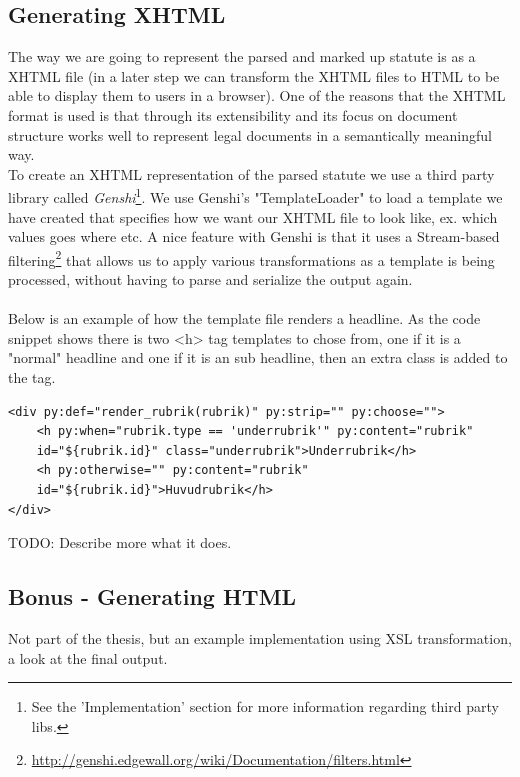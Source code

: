 \subsection{Generating XHTML}
The way we are going to represent the parsed and marked up statute is as a XHTML file (in a later step we can transform the XHTML files to HTML to be able to display them to users in a browser). One of the reasons that the XHTML format is used is that through its extensibility and its focus on document structure works well to represent legal documents in a semantically meaningful way.\\
To create an XHTML representation of the parsed statute we use a third party library called \textit{Genshi}\footnote{See the 'Implementation' section for more information regarding third party libs.}. We use Genshi's "TemplateLoader" to load a template we have created that specifies how we want our XHTML file to look like, ex. which values goes where etc. A nice feature with Genshi is that it uses a Stream-based filtering\footnote{\url{http://genshi.edgewall.org/wiki/Documentation/filters.html}} that allows us to apply various transformations as a template is being processed, without having to parse and serialize the output again.\\\\
Below is an example of how the template file renders a headline. As the code
snippet shows there is two <h> tag templates to chose from, one if it is a "normal" headline and one if it is an sub headline, then an extra class is added to the tag.\\
\begin{verbatim}
<div py:def="render_rubrik(rubrik)" py:strip="" py:choose="">
    <h py:when="rubrik.type == 'underrubrik'" py:content="rubrik"
	id="${rubrik.id}" class="underrubrik">Underrubrik</h>
    <h py:otherwise="" py:content="rubrik"
	id="${rubrik.id}">Huvudrubrik</h>
</div>
\end{verbatim}
\linebreak  
\newline
TODO: Describe more what it does.\\
\subsection{Bonus - Generating HTML}
Not part of the thesis, but an example implementation using XSL transformation, a look at the final output. 

